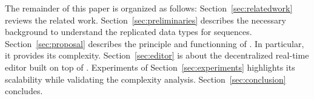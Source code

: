The remainder of this paper is organized as follows:
Section~\ref{sec:relatedwork} reviews the related work.
Section~\ref{sec:preliminaries} describes the necessary background to understand
the replicated data types for sequences. Section~\ref{sec:proposal} describes
the principle and functionning of \LSEQ. In particular, it provides its
complexity. Section~\ref{sec:editor} is about the decentralized real-time editor
built on top of \LSEQ. Experiments of Section~\ref{sec:experiments} highlights
its scalability while validating the complexity analysis.
Section~\ref{sec:conclusion} concludes.

